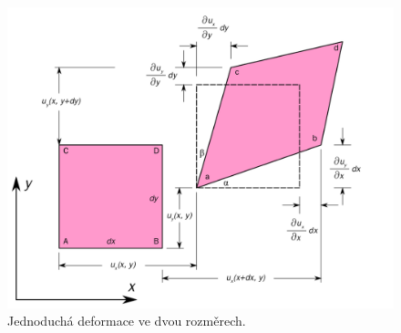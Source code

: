 \documentclass[12pt]{article}
\begin{document}
\begin{figure}
    \centering
    \includegraphics[width = 0.75\linewidth]{figures/2D_geometric_strain.svg.png}
    \caption{Jednoduchá deformace ve dvou rozměrech.~\cite{Figure:Strain}}
    \label{fig:Strain}
\end{figure}
\end{document}
